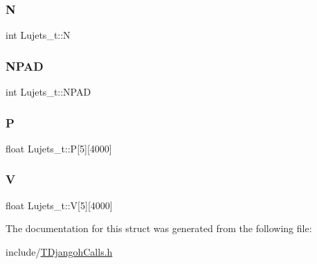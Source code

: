 \mbox{\label{struct_lujets__t_a17571954fa27f93e7a5bdaf763057547}} 
\subsubsection{\texorpdfstring{N}{N}}
{\footnotesize\ttfamily int Lujets\+\_\+t\+::N}

\mbox{\label{struct_lujets__t_a9bfadb28d8093e469dfed54f7df5b80e}} 
\subsubsection{\texorpdfstring{N\+P\+AD}{NPAD}}
{\footnotesize\ttfamily int Lujets\+\_\+t\+::\+N\+P\+AD}

\mbox{\label{struct_lujets__t_a591c8754d8715473ba628f50888dbb2d}} 
\subsubsection{\texorpdfstring{P}{P}}
{\footnotesize\ttfamily float Lujets\+\_\+t\+::P\mbox{[}5\mbox{]}\mbox{[}4000\mbox{]}}

\mbox{\label{struct_lujets__t_afdbdeea4a29351bc83bf85c549b6a796}} 
\subsubsection{\texorpdfstring{V}{V}}
{\footnotesize\ttfamily float Lujets\+\_\+t\+::V\mbox{[}5\mbox{]}\mbox{[}4000\mbox{]}}



The documentation for this struct was generated from the following file\+:\begin{DoxyCompactItemize}
\item 
include/\hyperlink{_t_djangoh_calls_8h}{T\+Djangoh\+Calls.\+h}\end{DoxyCompactItemize}
